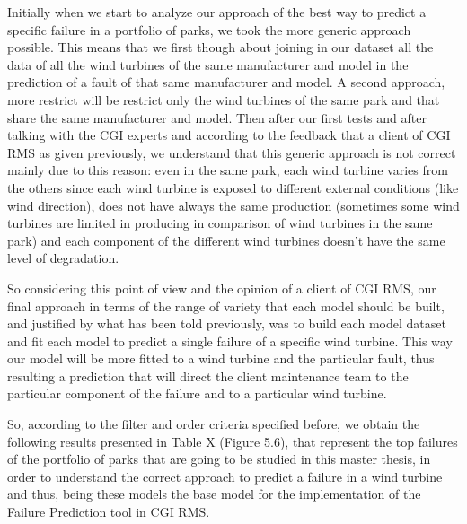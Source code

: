 Initially when we start to analyze our approach of the best way to predict a specific failure in a portfolio of parks, we took the more generic approach possible. This means that we first though about joining in our dataset all the data of all the wind turbines of the same manufacturer and model in the prediction of a fault of that same manufacturer and model. A second approach, more restrict will be restrict only the wind turbines of the same park and that share the same manufacturer and model. Then after our first tests and after talking with the CGI experts and according to the feedback that a client of CGI RMS as given previously, we understand that this generic approach is not correct mainly due to this reason: even in the same park, each wind turbine varies from the others since each wind turbine is exposed to different external conditions (like wind direction), does not have always the same production (sometimes some wind turbines are limited in producing in comparison of wind turbines in the same park) and each component of the different wind turbines doesn't have the same level of degradation. 


So considering this point of view and the opinion of a client of CGI RMS, our final approach in terms of the range of variety that each model should be built, and justified by what has been told previously, was to build each model dataset and fit each model to predict a single failure of a specific wind turbine. This way our model will be more fitted to a wind turbine and the particular fault, thus resulting a prediction that will direct the client maintenance team to the particular component of the failure and to a particular wind turbine.

So, according to the filter and order criteria specified before, we obtain the following results presented in Table X (Figure 5.6), that represent the top failures of the portfolio of parks that are going to be studied in this master thesis, in order to understand the correct approach to predict a failure in a wind turbine and thus, being these models the base model for the implementation of the Failure Prediction tool in CGI RMS.

